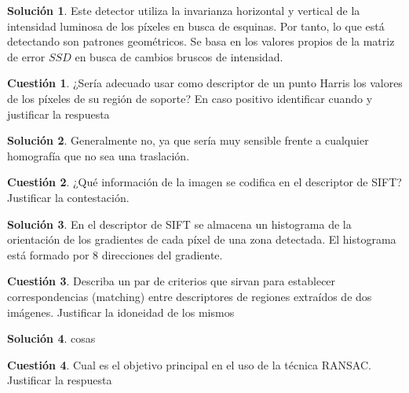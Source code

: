 \documentclass[a4paper, 11pt]{article}
\theoremstyle{definition}
\newtheorem{cuestion}{Cuestión}
\newtheorem*{solucion}{Solución}
\begin{document}
  \begin{solucion}
     	Este detector utiliza la invarianza horizontal y vertical de la intensidad
      luminosa de los píxeles en busca de esquinas. Por tanto, lo que está detectando son patrones
      geométricos. Se basa en los valores propios de la matriz de error $SSD$ en busca
      de cambios bruscos de intensidad.
  \end{solucion}
  \begin{cuestion}
    ¿Sería adecuado usar como descriptor de un punto Harris los valores de
    los píxeles de su región de soporte? En caso positivo identificar cuando y
    justificar la respuesta
  \end{cuestion}

  \begin{solucion}
     	Generalmente no, ya que sería muy sensible frente a cualquier homografía
      que no sea una traslación.
  \end{solucion}
  \begin{cuestion}
    ¿Qué información de la imagen se codifica en el descriptor de SIFT?
    Justificar la contestación.
  \end{cuestion}

  \begin{solucion}
     	En el descriptor de SIFT se almacena un histograma de la orientación de los
      gradientes de cada píxel de una zona detectada. El histograma está formado
      por 8 direcciones del gradiente.
  \end{solucion}

  \begin{cuestion}
    Describa un par de criterios que sirvan para establecer correspondencias
    (matching) entre descriptores de regiones extraídos de dos imágenes. Justificar
    la idoneidad de los mismos
  \end{cuestion}

  \begin{solucion}
     	cosas
  \end{solucion}

  \begin{cuestion}
    Cual es el objetivo principal en el uso de la técnica RANSAC. Justificar
    la respuesta
  \end{cuestion}
\end{document}
